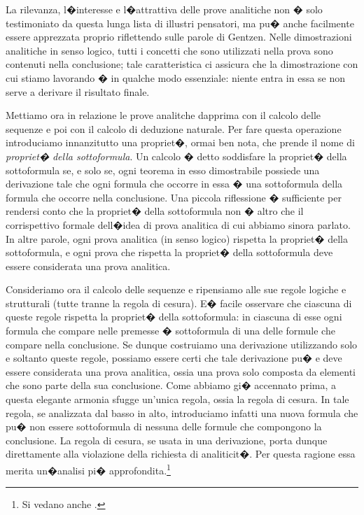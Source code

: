 \documentclass[a4paper,12pt]{aphex}
\begin{document}
\noindent La rilevanza, l�interesse e l�attrattiva delle prove analitiche non � solo testimoniato da questa lunga lista di illustri pensatori, ma pu� anche facilmente essere apprezzata proprio riflettendo sulle parole di Gentzen. Nelle dimostrazioni analitiche in senso logico,  tutti i concetti che sono utilizzati nella prova sono contenuti nella conclusione; tale caratteristica ci assicura che la dimostrazione con cui stiamo lavorando � in qualche modo essenziale: niente entra in essa se non serve a derivare il risultato finale.


Mettiamo ora in relazione le prove analitche dapprima con il calcolo delle sequenze e poi con il calcolo di deduzione naturale. Per fare questa operazione introduciamo innanzitutto una propriet�, ormai ben nota, che prende il nome di \emph{propriet� della sottoformula}. Un calcolo � detto soddisfare la propriet� della sottoformula se, e solo se, ogni teorema in esso dimostrabile possiede una derivazione tale che ogni formula che occorre in essa � una sottoformula della formula che occorre nella conclusione.  Una piccola riflessione � sufficiente per rendersi conto che la propriet� della sottoformula non � altro che il corrispettivo formale dell�idea di prova analitica di cui abbiamo sinora parlato. In altre parole, ogni prova analitica (in senso logico) rispetta la propriet� della sottoformula, e ogni prova che rispetta la propriet� della sottoformula deve essere considerata una prova analitica.

Consideriamo ora il calcolo delle sequenze e ripensiamo alle sue regole logiche e strutturali (tutte tranne la regola di cesura). E� facile osservare che ciascuna di queste regole rispetta la propriet� della sottoformula: in ciascuna di esse ogni formula che compare nelle premesse � sottoformula di una delle formule che compare nella conclusione. Se dunque costruiamo una derivazione utilizzando solo e soltanto queste regole, possiamo essere certi che tale derivazione pu� e deve essere considerata una prova analitica, ossia una prova solo composta da elementi che sono parte della sua conclusione. Come abbiamo gi� accennato prima, a questa elegante armonia sfugge un'unica regola, ossia la regola di cesura. In tale regola, se analizzata dal basso in alto, introduciamo infatti una nuova formula che pu� non essere sottoformula  di nessuna delle formule che compongono la conclusione. La regola di cesura, se usata in una derivazione, porta dunque direttamente alla violazione della richiesta di analiticit�.  Per questa ragione essa merita un�analisi pi� approfondita.\footnote{Si vedano anche \cite{boolos, agomonda, smullyan}.}
\end{document}
